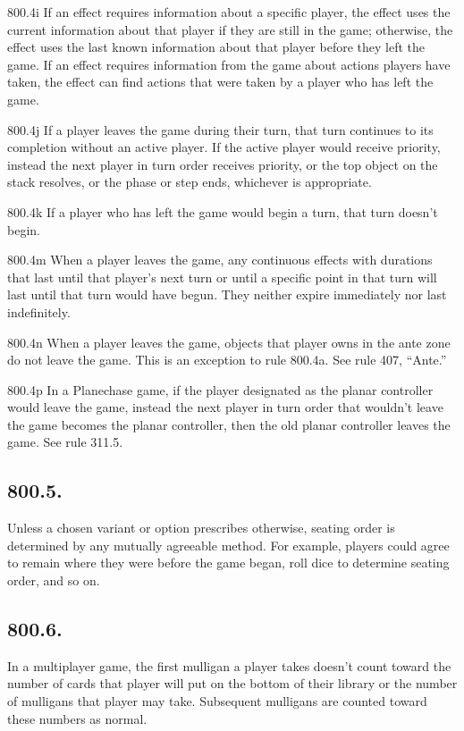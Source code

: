 800.4i If an effect requires information about a specific player, the effect uses the current information about that player if they are still in the game; otherwise, the effect uses the last known information about that player before they left the game. If an effect requires information from the game about actions players have taken, the effect can find actions that were taken by a player who has left the game.

800.4j If a player leaves the game during their turn, that turn continues to its completion without an active player. If the active player would receive priority, instead the next player in turn order receives priority, or the top object on the stack resolves, or the phase or step ends, whichever is appropriate.

800.4k If a player who has left the game would begin a turn, that turn doesn’t begin.

800.4m When a player leaves the game, any continuous effects with durations that last until that player’s next turn or until a specific point in that turn will last until that turn would have begun. They neither expire immediately nor last indefinitely.

800.4n When a player leaves the game, objects that player owns in the ante zone do not leave the game. This is an exception to rule 800.4a. See rule 407, “Ante.”

800.4p In a Planechase game, if the player designated as the planar controller would leave the game, instead the next player in turn order that wouldn’t leave the game becomes the planar controller, then the old planar controller leaves the game. See rule 311.5.

\subsection*{800.5.}
Unless a chosen variant or option prescribes otherwise, seating order is determined by any mutually agreeable method. For example, players could agree to remain where they were before the game began, roll dice to determine seating order, and so on.

\subsection*{800.6.}
In a multiplayer game, the first mulligan a player takes doesn’t count toward the number of cards that player will put on the bottom of their library or the number of mulligans that player may take. Subsequent mulligans are counted toward these numbers as normal.


